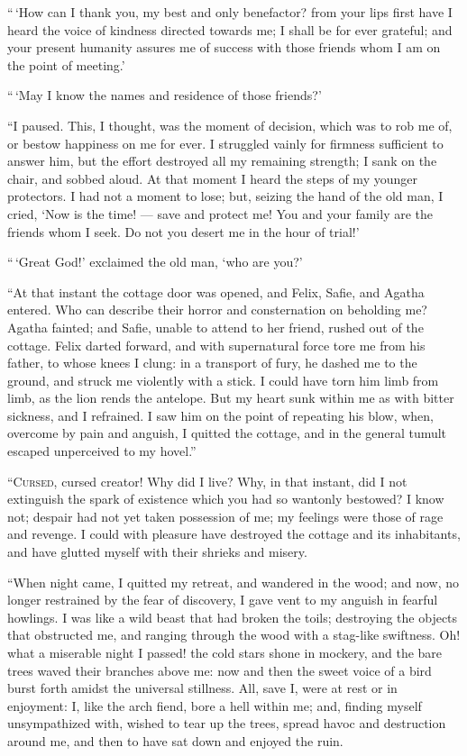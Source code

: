 ``\,`How can I thank you, my best
and only benefactor? from your lips
first have I heard the voice of kindness
directed towards me; I shall
be for ever grateful; and your present
humanity assures me of success
with those friends whom I am on the
point of meeting.'

``\,`May I know the names and residence
of those friends?'

``I paused. This, I thought, was
the moment of decision, which was to
rob me of, or bestow happiness on me
for ever. I struggled vainly for firmness
sufficient to answer him, but
the effort destroyed all my remaining
strength; I sank on the chair, and
sobbed aloud. At that moment I heard
the steps of my younger protectors. I
had not a moment to lose; but, seizing
the hand of the old man, I cried, `Now
is the time! --- save and protect me!
You and your family are the friends
whom I seek. Do not you desert me
in the hour of trial!'

``\,`Great God!' exclaimed the old
man, `who are you?'

``At that instant the cottage door
was opened, and Felix, Safie, and Agatha
entered. Who can describe their
horror and consternation on beholding
me? Agatha fainted; and Safie, unable
to attend to her friend, rushed out of
the cottage. Felix darted forward, and
with supernatural force tore me from
his father, to whose knees I clung: in
a transport of fury, he dashed me to the
ground, and struck me violently with a
stick. I could have torn him limb from
limb, as the lion rends the antelope.
But my heart sunk within me as with
bitter sickness, and I refrained. I saw
him on the point of repeating his blow,
when, overcome by pain and anguish,
I quitted the cottage, and in the general
tumult escaped unperceived to my
hovel.''


``\textsc{Cursed}, cursed creator! Why did
I live? Why, in that instant, did I
not extinguish the spark of existence
which you had so wantonly bestowed?
I know not; despair had not yet taken
possession of me; my feelings were
those of rage and revenge. I could
with pleasure have destroyed the cottage
and its inhabitants, and have glutted
myself with their shrieks and misery.

``When night came, I quitted my
retreat, and wandered in the wood;
and now, no longer restrained by the
fear of discovery, I gave vent to my
anguish in fearful howlings. I was like
a wild beast that had broken the toils;
destroying the objects that obstructed
me, and ranging through the wood with
a stag-like swiftness. Oh! what a miserable
night I passed! the cold stars
shone in mockery, and the bare trees
waved their branches above me: now
and then the sweet voice of a bird burst
forth amidst the universal stillness.
All, save I, were at rest or in enjoyment:
I, like the arch fiend, bore a hell within
me; and, finding myself unsympathized
with, wished to tear up the trees,
spread havoc and destruction around
me, and then to have sat down and
enjoyed the ruin.

